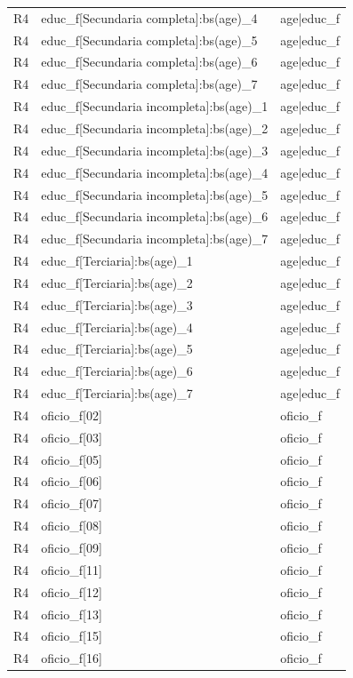 \begin{longtable}{lll}
R4 & educ\_f[Secundaria completa]:bs(age)\_4 & age|educ\_f \\
R4 & educ\_f[Secundaria completa]:bs(age)\_5 & age|educ\_f \\
R4 & educ\_f[Secundaria completa]:bs(age)\_6 & age|educ\_f \\
R4 & educ\_f[Secundaria completa]:bs(age)\_7 & age|educ\_f \\
R4 & educ\_f[Secundaria incompleta]:bs(age)\_1 & age|educ\_f \\
R4 & educ\_f[Secundaria incompleta]:bs(age)\_2 & age|educ\_f \\
R4 & educ\_f[Secundaria incompleta]:bs(age)\_3 & age|educ\_f \\
R4 & educ\_f[Secundaria incompleta]:bs(age)\_4 & age|educ\_f \\
R4 & educ\_f[Secundaria incompleta]:bs(age)\_5 & age|educ\_f \\
R4 & educ\_f[Secundaria incompleta]:bs(age)\_6 & age|educ\_f \\
R4 & educ\_f[Secundaria incompleta]:bs(age)\_7 & age|educ\_f \\
R4 & educ\_f[Terciaria]:bs(age)\_1 & age|educ\_f \\
R4 & educ\_f[Terciaria]:bs(age)\_2 & age|educ\_f \\
R4 & educ\_f[Terciaria]:bs(age)\_3 & age|educ\_f \\
R4 & educ\_f[Terciaria]:bs(age)\_4 & age|educ\_f \\
R4 & educ\_f[Terciaria]:bs(age)\_5 & age|educ\_f \\
R4 & educ\_f[Terciaria]:bs(age)\_6 & age|educ\_f \\
R4 & educ\_f[Terciaria]:bs(age)\_7 & age|educ\_f \\
R4 & oficio\_f[02] & oficio\_f \\
R4 & oficio\_f[03] & oficio\_f \\
R4 & oficio\_f[05] & oficio\_f \\
R4 & oficio\_f[06] & oficio\_f \\
R4 & oficio\_f[07] & oficio\_f \\
R4 & oficio\_f[08] & oficio\_f \\
R4 & oficio\_f[09] & oficio\_f \\
R4 & oficio\_f[11] & oficio\_f \\
R4 & oficio\_f[12] & oficio\_f \\
R4 & oficio\_f[13] & oficio\_f \\
R4 & oficio\_f[15] & oficio\_f \\
R4 & oficio\_f[16] & oficio\_f \\

\end{longtable}

